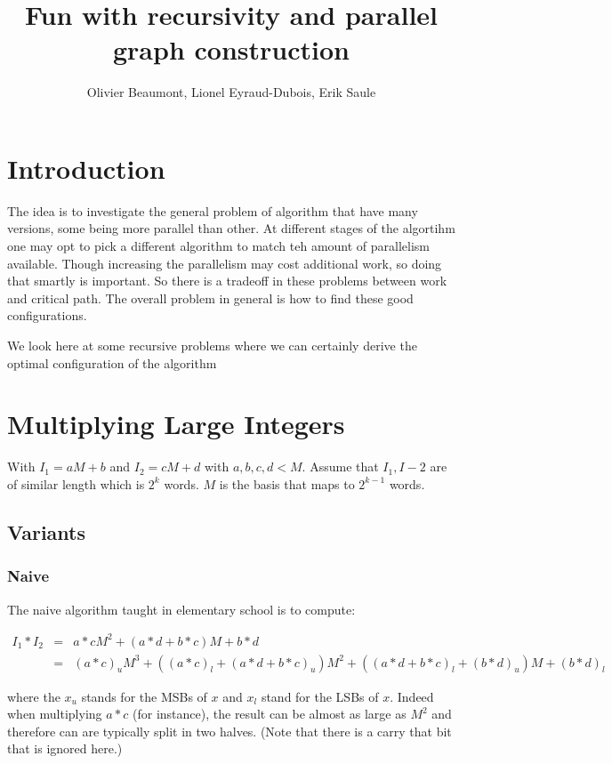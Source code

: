 \documentclass{article}
\author{Olivier Beaumont, Lionel Eyraud-Dubois, Erik Saule}
\title{Fun with recursivity and parallel graph construction}
\begin{document}
\maketitle

\section{Introduction}

The idea is to investigate the general problem of algorithm that have
many versions, some being more parallel than other. At different
stages of the algortihm one may opt to pick a different algorithm to
match teh amount of parallelism available. Though increasing the
parallelism may cost additional work, so doing that smartly is
important. So there is a tradeoff in these problems between work and
critical path. The overall problem in general is how to find these
good configurations.

We look here at some recursive problems where we can certainly derive
the optimal configuration of the algorithm

\section{Multiplying Large Integers}

With $I_1 = aM + b$ and $I_2 = cM + d$ with $a,b,c,d < M$. Assume that
$I_1, I-2$ are of similar length which is $2^k$ words. $M$ is the
basis that maps to $2^{k-1}$ words.

\subsection{Variants}

\subsubsection{Naive}

The naive algorithm taught in elementary school is to compute:

\begin{align}
  I_1 * I_2 & = & a*c M^2 + (a * d + b * c ) M + b*d \\
            & = & (a*c)_{u} M^3 + ((a*c)_{l} + (a * d + b * c )_{u}) M^2 + ( (a * d + b * c )_{l} + (b*d)_{u} ) M + (b*d)_{l}
\end{align}

where the $x_u$ stands for the MSBs of $x$ and $x_l$ stand for the
LSBs of $x$. Indeed when multiplying $a*c$ (for instance), the result
can be almost as large as $M^2$ and therefore can are typically split
in two halves. (Note that there is a carry that bit that is ignored
here.)
\end{document}
